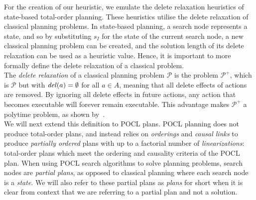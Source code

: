 For the creation of our heuristic, we emulate the delete relaxation heuristics of state-based total-order planning. These heuristics utilise the delete relaxation of classical planning problems. In state-based planning, a search node represents a state, and so by substituting $s_I$ for the state of the current search node, a new classical planning problem can be created, and the solution length of its delete relaxation can be used as a heuristic value. Hence, it is important to more formally define the delete relaxation of a classical problem.\\


The \textit{delete relaxation} of a classical planning problem $\mathcal{P}$ is the problem $\mathcal{P}^+$, which is $\mathcal{P}$ but with $\mathit{del}(a)=\emptyset$ for all $a\in A$, meaning that all delete effects of actions are removed. By ignoring all delete effects in future actions, any action that becomes executable will forever remain executable. This advantage makes $\mathcal{P}^+$ a polytime problem, as shown by~\cite{Bylander1994ComplexityOfSTRIPS}.\\


We will next extend this definition to POCL plans. POCL planning does not produce total-order plans, and instead relies on \textit{orderings} and \textit{causal links} to produce \textit{partially ordered} plans with up to a factorial number of \textit{linearizations}: total-order plans which meet the ordering and causality criteria of the POCL plan. When using POCL search algorithms to solve planning problems, search nodes are \textit{partial plans}, as opposed to classical planning where each search node is a \textit{state}. We will also refer to these partial plans as \textit{plans} for short when it is clear from context that we are referring to a partial plan and not a solution.\\


